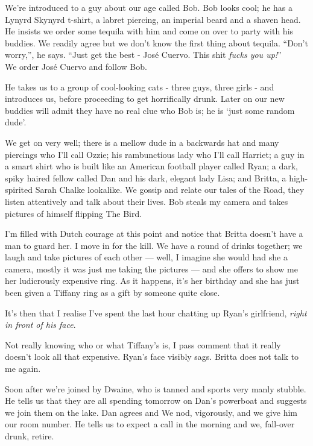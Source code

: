 \documentclass[a5paper,10pt,titlepage,draft]{book}
\begin{document}
We're introduced to a guy about our age called Bob.  Bob looks cool; he has a Lynyrd Skynyrd t-shirt, a labret piercing, an imperial beard and a shaven head.  He insists we order some tequila with him and come on over to party with his buddies.  We readily agree but we don't know the first thing about tequila.  ``Don't worry,'', he says.  ``Just get the best - Jos\'{e} Cuervo.  This shit \emph{fucks you up!}'' \\
We order Jos\'{e} Cuervo and follow Bob.


He takes us to a group of cool-looking cats - three guys, three girls - and introduces us, before proceeding to get horrifically drunk.  Later on our new buddies will admit they have no real clue who Bob is; he is `just some random dude'.

We get on very well; there is a mellow dude in a backwards hat and many piercings who I'll call Ozzie; his rambunctious lady who I'll call Harriet; a guy in a smart shirt who is built like an American football player called Ryan; a dark, spiky haired fellow called Dan and his dark, elegant lady Lisa; and Britta, a high-spirited Sarah Chalke lookalike.  We gossip and relate our tales of the Road, they listen attentively and talk about their lives.  Bob steals my camera and takes pictures of himself flipping The Bird.

I'm filled with Dutch courage at this point and notice that Britta doesn't have a man to guard her.  I move in for the kill.  We have a round of drinks together; we laugh and take pictures of each other --- well, I imagine she would had she a camera, mostly it was just me taking the pictures --- and she offers to show me her ludicrously expensive ring.  As it happens, it's her birthday and she has just been given a Tiffany ring as a gift by someone quite close.

It's then that I realise I've spent the last hour chatting up Ryan's girlfriend, \emph{right in front of his face}.

Not really knowing who or what Tiffany's is, I pass comment that it really doesn't look all that expensive.  Ryan's face visibly sags.  Britta does not talk to me again.

Soon after we're joined by Dwaine, who is tanned and sports very manly stubble.  He tells us that they are all spending tomorrow on Dan's powerboat and suggests we join them on the lake.  Dan agrees and We nod, vigorously, and we give him our room number.  He tells us to expect a call in the morning and we, fall-over drunk, retire.
\end{document}
